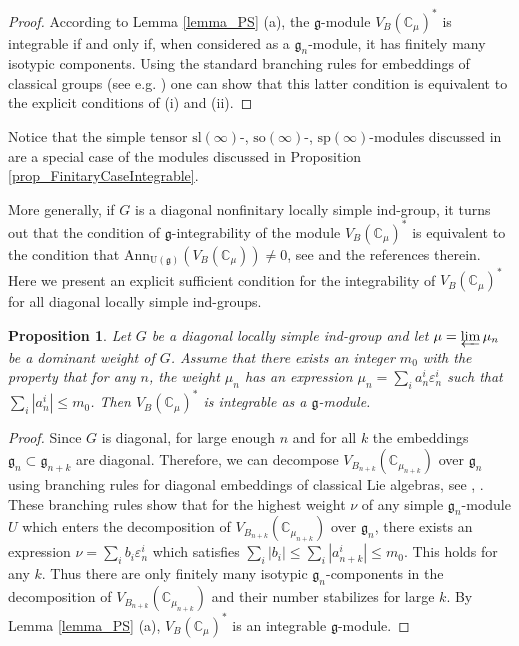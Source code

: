 \documentclass[12pt]{article}
\renewcommand{\sl} {\mathrm{sl}}
\newcommand{\so}   {\mathrm{so}}
\renewcommand{\sp}   {\mathrm{sp}}
\def\CC {{\mathbb C}}     %
\def \g {\mathfrak{g}}
\newtheorem{prop}[theorem]{Proposition}
\begin{document}
\begin{proof}
According to Lemma \ref{lemma_PS} (a), the $\g$-module $V_B(\CC_{\mu})^*$ is integrable if and only if, when considered as a $\g_n$-module, it has finitely many isotypic components. Using the standard branching rules for embeddings of classical groups (see e.g. \cite{Z}) one can show that this latter condition is equivalent to the explicit conditions of (i) and (ii).
\end{proof}

Notice that the simple tensor $\sl(\infty)$-, $\so(\infty)$-, $\sp(\infty)$-modules discussed in \cite{PS} are a special case of the modules discussed in Proposition \ref{prop_FinitaryCaseIntegrable}.

More generally, if $G$ is a diagonal nonfinitary locally simple ind-group, it turns out that the condition of $\g$-integrability of the module $V_B(\CC_{\mu})^*$ is equivalent to the condition that $\mathrm{Ann}_{\mathrm{U}(\g)}(V_{B}(\CC_{\mu})) \neq 0$, see \cite[Proposition 4.5]{PP} and the references therein. Here we present an explicit sufficient condition for the integrability of $V_B(\CC_{\mu})^*$ for all diagonal locally simple ind-groups.

\begin{prop} \label{prop_Int}
Let $G$ be a diagonal locally simple ind-group and let $\mu = \varprojlim \mu_n$ be a dominant weight of $G$. Assume that there exists an integer $m_0$ with the property that for any $n$, the weight $\mu_n$ has an expression $\mu_n = \sum_i a_n^i \varepsilon_n^i$ such that $\sum_i |a_n^i| \leq m_0$. Then $V_B(\CC_{\mu})^*$ is integrable as a $\g$-module.
\end{prop}

\begin{proof}  
Since $G$ is diagonal, for large enough $n$ and for all $k$ the embeddings $\g_n \subset \g_{n+k}$ are diagonal. Therefore, we can decompose $V_{B_{n+k}}(\CC_{\mu_{n+k}})$ over $\g_n$ using branching rules for diagonal embeddings of classical Lie algebras, see \cite{HTW}, \cite{Hr}. 
These branching rules show that for the highest weight $\nu$ of any simple $\g_n$-module $U$ which enters the decomposition of $V_{B_{n+k}}(\CC_{\mu_{n+k}})$ over $\g_n$, there exists an expression $\nu = \sum_i b_i \varepsilon_n^i$ which satisfies $\sum_i|b_i| \leq \sum_i|a_{n+k}^i| \leq m_0$. This holds for any $k$. Thus there are only finitely many isotypic $\g_n$-components in the decomposition of $V_{B_{n+k}}(\CC_{\mu_{n+k}})$ and their number stabilizes for large $k$. By Lemma \ref{lemma_PS} (a), $V_B(\CC_{\mu})^*$ is an integrable $\g$-module.
\end{proof}
\end{document}
